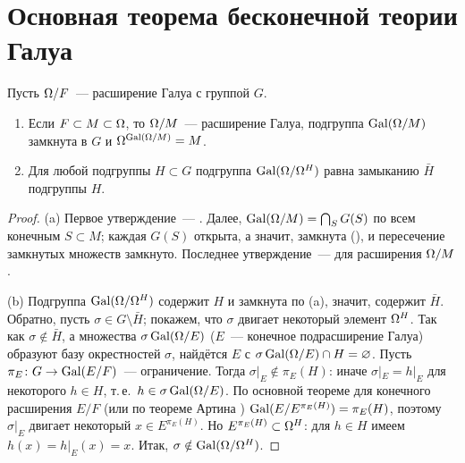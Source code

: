 \section{Основная теорема бесконечной теории Галуа}

\begin{proposition}[7.12]
Пусть $\Omega/F$~--- расширение Галуа с группой $G$.
\begin{enumerate}[label=\textup{(\alph*)}]
\item Если $F\subset M\subset\Omega$, то $\Omega/M$~--- расширение Галуа, подгруппа $\operatorname{Gal}(\Omega/M)$ замкнута в $G$ и
$\Omega^{\operatorname{Gal}(\Omega/M)}=M$.
\item Для любой подгруппы $H\subset G$ подгруппа $\operatorname{Gal}(\Omega/\Omega^H)$ равна замыканию $\bar H$ подгруппы $H$.
\end{enumerate}
\end{proposition}

\begin{proof}
(a) Первое утверждение~--- . Далее, $\operatorname{Gal}(\Omega/M)=\bigcap_{S}G(S)$ по всем конечным $S\subset M$; каждая $G(S)$
открыта, а значит, замкнута (), и пересечение замкнутых множеств замкнуто. Последнее утверждение~---  для
расширения $\Omega/M$.

(b) Подгруппа $\operatorname{Gal}(\Omega/\Omega^H)$ содержит $H$ и замкнута по (a), значит, содержит $\bar H$. Обратно, пусть
$\sigma\in G\setminus\bar H$; покажем, что $\sigma$ двигает некоторый элемент $\Omega^H$. Так как $\sigma\notin\bar H$, а
множества $\sigma\operatorname{Gal}(\Omega/E)$ ($E$~--- конечное подрасширение Галуа) образуют базу окрестностей $\sigma$, найдётся $E$
с $\sigma\operatorname{Gal}(\Omega/E)\cap H=\varnothing$. Пусть $\pi_E\colon G\to\operatorname{Gal}(E/F)$~--- ограничение. Тогда
$\sigma|_E\notin\pi_E(H)$: иначе $\sigma|_E=h|_E$ для некоторого $h\in H$, т.\,е.\ $h\in\sigma\operatorname{Gal}(\Omega/E)$. По основной
теореме для конечного расширения $E/F$ (или по теореме Артина ) $\operatorname{Gal}(E/E^{\pi_E(H)})=\pi_E(H)$, поэтому $\sigma|_E$
двигает некоторый $x\in E^{\pi_E(H)}$. Но $E^{\pi_E(H)}\subset\Omega^H$: для $h\in H$ имеем $h(x)=h|_E(x)=x$. Итак,
$\sigma\notin\operatorname{Gal}(\Omega/\Omega^H)$.
\end{proof}

\begin{center}
\end{center}

